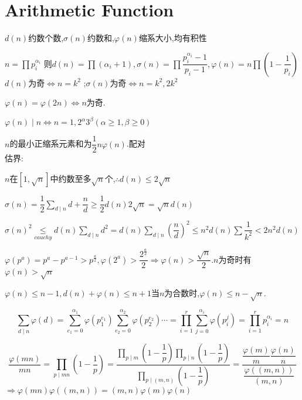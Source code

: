 
\section{Arithmetic Function}
$ d(n)$约数个数,$ \sigma (n)$约数和,$ \varphi(n)$缩系大小,均有积性

$ n=\prod{p_i^{\alpha_i}}$ 则$d(n)=\prod{(\alpha_i+1)},\sigma(n)=\prod{\dfrac{p_i^{\alpha_i}-1}{p_i-1}},\varphi(n)=n\prod({1-\dfrac{1}{p_i}})$
\\

$ d(n)$为奇$ \Leftrightarrow n=k^2$ ;$ \sigma(n)$为奇$ \Leftrightarrow n=k^2,2k^2$

$ \varphi(n)=\varphi(2n)\Leftrightarrow n$为奇.

$ \varphi(n) \mid n\Leftrightarrow n=1,2^{\alpha}3^{\beta}(\alpha \ge 1,\beta \ge 0)$

$ n$的最小正缩系元素和为$ \dfrac{1}{2}n\varphi(n)$.配对
\\

估界:

$ n$在$ [1,\sqrt{n}]$中约数至多$ \sqrt{n}$个,$ \therefore d(n)\le 2\sqrt{n}$

$ \sigma(n)=\dfrac{1}{2}\sum_{d \mid n}{d+\dfrac{n}{d}}\ge \dfrac{1}{2}d(n)2\sqrt{n}=\sqrt{n}d(n)$

$ \sigma(n)^2 \mathop \le \limits_{cauchy} d(n)\sum_{d\mid n}{d^2}=d(n)\sum_{d\mid n}{(\dfrac{n}{d})^2}\le n^2d(n)\sum{\dfrac{1}{k^2}}<2n^2d(n)$

$ \varphi(p^a)=p^a-p^{a-1}>p^{\frac{a}{2}},\varphi(2^a)>\dfrac{2^{\frac{a}{2}}}{2}\Rightarrow \varphi(n)>\dfrac{\sqrt{n}}{2}.n$为奇时有$ \varphi(n)>\sqrt{n}$

$ \varphi(n)\le n-1,d(n)+\varphi(n)\le n+1$当$ n$为合数时,$ \varphi(n)\le n-\sqrt{n}.$

\[  \sum_{d \mid n}{\varphi(d)}=\sum_{e_1=0}^{\alpha_1}{\varphi(p_1^{e_1})}\sum_{e_2=0}^{\alpha_2}{\varphi(p_2^{e_2})}\cdots =\prod_{i=1}^{r}{\sum_{j=0}^{\alpha_i}{\varphi(p_i^j)}}=\prod_{i=1}^{r}{p_i^{\alpha_i}}=n\]

\[ \dfrac{\varphi(mn)}{mn}=\prod_{p \mid mn}{(1-\dfrac{1}{p})}=\dfrac{\prod_{p \mid m}{(1-\dfrac{1}{p})}\prod_{p \mid n}{(1-\dfrac{1}{p})}}{\prod_{p \mid (m,n)}{(1-\dfrac{1}{p})}}=\dfrac{\dfrac{\varphi(m)}{m}\dfrac{\varphi(n)}{n}}{\dfrac{\varphi((m,n))}{(m,n)}} \]
$ \Rightarrow \varphi(mn)\varphi((m,n))=(m,n)\varphi(m)\varphi(n) $ 
\\

